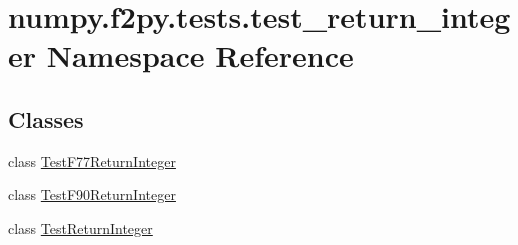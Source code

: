 \hypertarget{namespacenumpy_1_1f2py_1_1tests_1_1test__return__integer}{}\section{numpy.\+f2py.\+tests.\+test\+\_\+return\+\_\+integer Namespace Reference}
\label{namespacenumpy_1_1f2py_1_1tests_1_1test__return__integer}
\subsection*{Classes}
\begin{DoxyCompactItemize}
\item 
class \hyperlink{classnumpy_1_1f2py_1_1tests_1_1test__return__integer_1_1TestF77ReturnInteger}{Test\+F77\+Return\+Integer}
\item 
class \hyperlink{classnumpy_1_1f2py_1_1tests_1_1test__return__integer_1_1TestF90ReturnInteger}{Test\+F90\+Return\+Integer}
\item 
class \hyperlink{classnumpy_1_1f2py_1_1tests_1_1test__return__integer_1_1TestReturnInteger}{Test\+Return\+Integer}
\end{DoxyCompactItemize}
